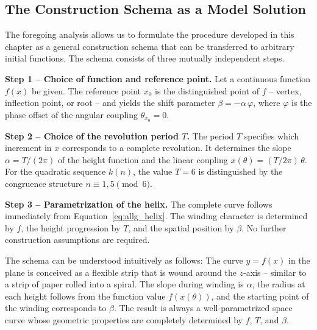 \subsection{The Construction Schema as a Model Solution}

The foregoing analysis allows us to formulate the procedure developed in this chapter
as a general construction schema that
can be transferred to arbitrary initial functions. The schema
consists of three mutually independent steps.

\textbf{Step 1 -- Choice of function and reference point.}
Let a continuous function $f(x)$ be given. The reference point $x_0$ is
the distinguished point of $f$ -- vertex, inflection point, or
root -- and yields the shift parameter $\beta = -\alpha\,\varphi$,
where $\varphi$ is the phase offset of the angular coupling $\theta_{x_0} = 0$.

\textbf{Step 2 -- Choice of the revolution period $T$.}
The period $T$ specifies which increment in $x$ corresponds to a complete
revolution. It determines the slope $\alpha = T/(2\pi)$
of the height function and the linear coupling $x(\theta) = (T/2\pi)\,\theta$.
For the quadratic sequence $k(n)$, the value $T = 6$ is distinguished by the
congruence structure $n \equiv 1, 5 \pmod{6}$.

\textbf{Step 3 -- Parametrization of the helix.}
The complete curve follows immediately from
Equation~\eqref{eq:allg_helix}. The winding character is determined by $f$,
the height progression by $T$, and the spatial position by $\beta$.
No further construction assumptions are required.

\begin{remark}
The schema can be understood intuitively as follows: The curve $y = f(x)$ in the
plane is conceived as a flexible strip that is wound around the
$z$-axis -- similar to a strip of paper rolled into a
spiral. The slope during winding is $\alpha$, the
radius at each height follows from the function value $f(x(\theta))$, and
the starting point of the winding corresponds to $\beta$. The result is always
a well-parametrized space curve whose geometric properties
are completely determined by $f$, $T$, and $\beta$.
\end{remark}
